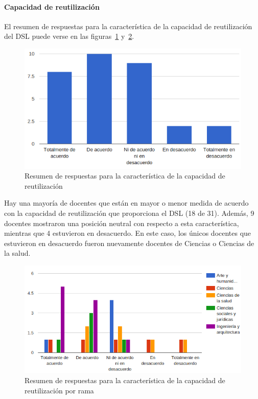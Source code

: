 \newpage
\paragraph*{Capacidad de reutilización}

El resumen de respuestas para la característica de la capacidad de reutilización del DSL puede verse en las figuras~\ref{fig:evalmetodo:dsl:reutilizable} y~\ref{fig:evalmetodo:dsl:reutilizable:rama}.

\begin{figure}[h]
  \begin{center}
    \includegraphics[scale=0.45]{C_DSL_reutilizable.png}
  \end{center}
  \caption{Resumen de respuestas para la característica de la capacidad de reutilización}
  \label{fig:evalmetodo:dsl:reutilizable}
\end{figure}

Hay una mayoría de docentes que están en mayor o menor medida de acuerdo con la capacidad de reutilización que proporciona el DSL (18 de 31). Además, 9 docentes mostraron una posición neutral con respecto a esta característica, mientras que 4 estuvieron en desacuerdo. En este caso, los únicos docentes que estuvieron en desacuerdo fueron nuevamente docentes de Ciencias o Ciencias de la salud.

\begin{figure}[h]
  \begin{center}
    \includegraphics[scale=0.45]{C_DSL_reutilizable_rama.png}
  \end{center}
  \caption{Resumen de respuestas para la característica de la capacidad de reutilización por rama}
  \label{fig:evalmetodo:dsl:reutilizable:rama}
\end{figure}

